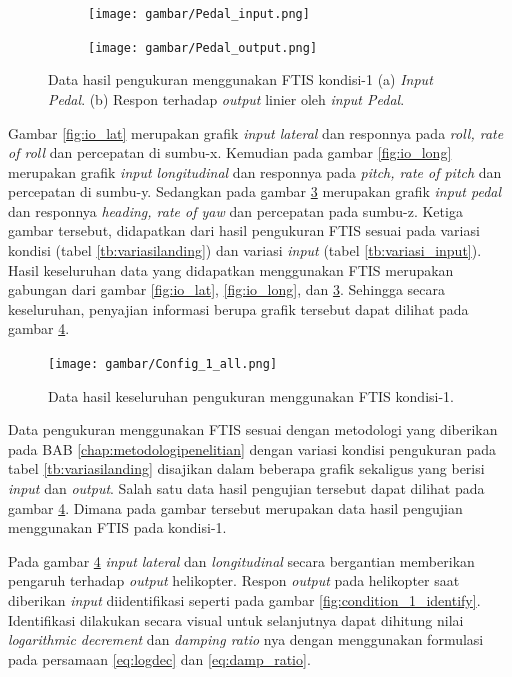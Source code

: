 \begin{figure}[H]
	\begin{subfigure}{0.45\textwidth}
		\centering
		\texttt{[image: gambar/Pedal\_input.png]}
		\caption{}
		\label{fig:Pedal_input}
	\end{subfigure}
	\centering
	\begin{subfigure}{0.45\textwidth}
		\centering
		\texttt{[image: gambar/Pedal\_output.png]}
		\caption{}
		\label{fig:Pedal_output}
	\end{subfigure}
	\caption{Data hasil pengukuran menggunakan FTIS kondisi-1 (a) \textit{Input Pedal}. (b) Respon terhadap \textit{output} linier oleh \textit{input Pedal}.}
	\label{fig:io_pedal}
\end{figure}

Gambar \ref{fig:io_lat} merupakan grafik \textit{input lateral} dan responnya pada \textit{roll, rate of roll} dan percepatan di sumbu-x. Kemudian pada gambar \ref{fig:io_long} merupakan grafik \textit{input longitudinal} dan responnya pada \textit{pitch, rate of pitch} dan percepatan di sumbu-y. Sedangkan pada gambar \ref{fig:io_pedal} merupakan grafik \textit{input pedal} dan responnya \textit{heading, rate of yaw} dan percepatan pada sumbu-z. Ketiga gambar tersebut, didapatkan dari hasil pengukuran FTIS sesuai pada variasi kondisi (tabel \ref{tb:variasilanding}) dan variasi \textit{input} (tabel \ref{tb:variasi_input}). Hasil keseluruhan data yang didapatkan menggunakan FTIS merupakan gabungan dari gambar \ref{fig:io_lat}, \ref{fig:io_long}, dan \ref{fig:io_pedal}. Sehingga secara keseluruhan, penyajian informasi berupa grafik tersebut dapat dilihat pada gambar \ref{fig:condition_1}.

\begin{figure}[H]
	\centering
	\texttt{[image: gambar/Config\_1\_all.png]}
	\caption{Data hasil keseluruhan pengukuran menggunakan FTIS kondisi-1.}
	\label{fig:condition_1}
\end{figure}

Data pengukuran menggunakan FTIS sesuai dengan metodologi yang diberikan pada BAB \ref{chap:metodologipenelitian} dengan variasi kondisi pengukuran pada tabel \ref{tb:variasilanding} disajikan dalam beberapa grafik sekaligus yang berisi \textit{input} dan \textit{output}. Salah satu data hasil pengujian tersebut dapat dilihat pada gambar \ref{fig:condition_1}. Dimana pada gambar tersebut merupakan data hasil pengujian menggunakan FTIS pada kondisi-1.

Pada gambar \ref{fig:condition_1} \textit{input} \textit{lateral} dan \textit{longitudinal} secara bergantian memberikan pengaruh terhadap \textit{output} helikopter. Respon \textit{output} pada helikopter saat diberikan \textit{input} diidentifikasi seperti pada gambar \ref{fig:condition_1_identify}. Identifikasi dilakukan secara visual untuk selanjutnya dapat dihitung nilai \textit{logarithmic decrement} dan \textit{damping ratio} nya dengan menggunakan formulasi pada persamaan \ref{eq:logdec} dan \ref{eq:damp_ratio}.

